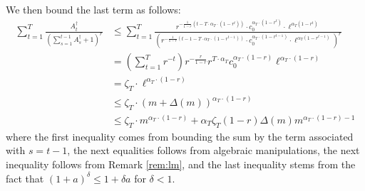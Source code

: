 \documentclass[blindrev]{informs3noheader}
\begin{document}
We then bound the last term as follows:
\begin{align*}
\sum_{t=1}^T \frac{A^\dagger_t}{\left(\sum_{s=1}^{t-1} A^\dagger_s +1\right)^r}
&\leq \sum_{t=1}^T \frac{r^{-\frac{1}{1-r}\left(t-T\cdot\alpha_T\cdot(1-r^t)\right)}\cdot c_0^{\alpha_T\cdot(1-r^t)}\cdot \ell^{\alpha_T(1-r^t)}}{\left(r^{-\frac{1}{1-r}\left(t-1-T\cdot\alpha_T\cdot(1-r^{t-1})\right)}\cdot c_0^{\alpha_T\cdot(1-r^{t-1})}\cdot \ell^{\alpha_T(1-r^{t-1})}\right)^r}\\
&= \left(\sum_{t=1}^T r^{-t}\right)r^{-\frac{r}{1-r}}r^{T\cdot \alpha_T}c_0^{\alpha_T\cdot (1-r)}\ell^{\alpha_T\cdot (1-r)}\\
&= \zeta_T\cdot\ell^{\alpha_T\cdot (1-r)}\\
&\leq \zeta_T \cdot \left(m+ \Delta(m)\right)^{\alpha_T\cdot (1-r)}
\\&\leq  \zeta_T \cdot m^{\alpha_T \cdot (1-r)} +  \alpha_T\zeta_T(1-r) \Delta(m)m^{\alpha_T \cdot (1-r)-1}
\end{align*}
where the first inequality comes from bounding the sum by the term associated with $s=t-1$, the next equalities follows from algebraic manipulations, the next inequality follows from Remark \ref{rem:lm}, and the last inequality stems from the fact that $(1+a)^\delta\leq1+\delta a$ for $\delta<1$.
\end{document}
